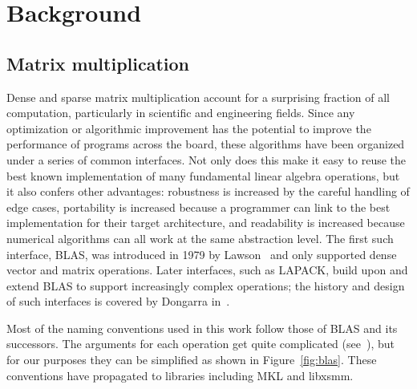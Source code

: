 \chapter{Background}
\label{chapter:review}

\section{Matrix multiplication}

Dense and sparse matrix multiplication account for a surprising fraction of all computation, particularly in scientific and engineering fields. Since any optimization or algorithmic improvement has the potential to improve the performance of programs across the board, these algorithms have been organized under a series of common interfaces. Not only does this make it easy to reuse the best known implementation of many fundamental linear algebra operations, but it also confers other advantages: robustness is increased by the careful handling of edge cases, portability is increased because a programmer can link to the best implementation for their target architecture, and readability is increased because numerical algorithms can all work at the same abstraction level. The first such interface, \gls{BLAS}, was introduced in 1979 by Lawson~\cite{Lawson:1979:BLA:355841.355847} and only supported dense vector and matrix operations. Later interfaces, such as LAPACK, build upon and extend \gls{BLAS} to support increasingly complex operations; the history and design of such interfaces is covered by Dongarra in~\cite{Dongarra:1998:NLA:552704}. 

Most of the naming conventions used in this work follow those of BLAS and its successors. The arguments for each operation get quite complicated (see~\cite{IntelCSCMM}), but for our purposes they can be simplified as shown in Figure~\ref{fig:blas}. These conventions have propagated to libraries including MKL and libxsmm.

